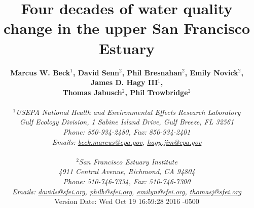 \documentclass[letterpaper,12pt,oneside]{article}\usepackage[]{graphicx}\usepackage[]{color}
\begin{document}
\raggedbottom
\linenumbers
\raggedright
{}
\setlength{\parindent}{0.5in}
\renewcommand\refname{References \vspace{12pt}}

\begin{singlespace}
\title{{\bf {\Large Four decades of water quality change in the upper San Francisco Estuary}}}
\author{
  {\bf {\normalsize Marcus W. Beck$^1$, David Senn$^2$, Phil Bresnahan$^2$, Emily Novick$^2$, James D. Hagy III$^1$,}}
  \\{\bf {\normalsize Thomas Jabusch$^2$, Phil Trowbridge$^2$}}
  \\\\{\textit {\normalsize $^1$USEPA National Health and Environmental Effects Research Laboratory}}
  \\{\textit {\normalsize Gulf Ecology Division, 1 Sabine Island Drive, Gulf Breeze, FL 32561}}
	\\{\textit {\normalsize Phone: 850-934-2480, Fax: 850-934-2401}}
	\\{\textit {\normalsize Emails: \href{mailto:beck.marcus@epa.gov}{beck.marcus@epa.gov}, \href{mailto:hagy.jim@epa.gov}{hagy.jim@epa.gov}}}
  \\\\{\textit {\normalsize $^2$San Francisco Estuary Institute}}
	\\{\textit {\normalsize 4911 Central Avenue, Richmond, CA 94804}}
	\\{\textit {\normalsize Phone: 510-746-7334, Fax: 510-746-7300}}
	\\{\textit {\normalsize Emails: \href{mailto:davids@sfei.org}{davids@sfei.org}, \href{mailto:philb@sfei.org}{philb@sfei.org}, \href{mailto:emilyn@sfei.org}{emilyn@sfei.org}, \href{mailto:thomasj@sfei.org}{thomasj@sfei.org}}}
  \vspace{1in} 
  \\ Version Date:   Wed Oct 19 16:59:28 2016 -0500
	}
\date{}
\maketitle
\end{singlespace}
\clearpage
\end{document}
